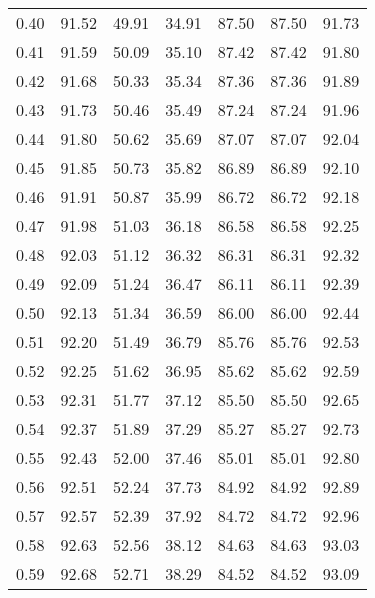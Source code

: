 \begin{tabular}{|c|c|c|c|c|c|c|}
      0.40 &     91.52 &     49.91 &      34.91 &   87.50 &      87.50 &         91.73 \\
      0.41 &     91.59 &     50.09 &      35.10 &   87.42 &      87.42 &         91.80 \\
      0.42 &     91.68 &     50.33 &      35.34 &   87.36 &      87.36 &         91.89 \\
      0.43 &     91.73 &     50.46 &      35.49 &   87.24 &      87.24 &         91.96 \\
      0.44 &     91.80 &     50.62 &      35.69 &   87.07 &      87.07 &         92.04 \\
      0.45 &     91.85 &     50.73 &      35.82 &   86.89 &      86.89 &         92.10 \\
      0.46 &     91.91 &     50.87 &      35.99 &   86.72 &      86.72 &         92.18 \\
      0.47 &     91.98 &     51.03 &      36.18 &   86.58 &      86.58 &         92.25 \\
      0.48 &     92.03 &     51.12 &      36.32 &   86.31 &      86.31 &         92.32 \\
      0.49 &     92.09 &     51.24 &      36.47 &   86.11 &      86.11 &         92.39 \\
      0.50 &     92.13 &     51.34 &      36.59 &   86.00 &      86.00 &         92.44 \\
      0.51 &     92.20 &     51.49 &      36.79 &   85.76 &      85.76 &         92.53 \\
      0.52 &     92.25 &     51.62 &      36.95 &   85.62 &      85.62 &         92.59 \\
      0.53 &     92.31 &     51.77 &      37.12 &   85.50 &      85.50 &         92.65 \\
      0.54 &     92.37 &     51.89 &      37.29 &   85.27 &      85.27 &         92.73 \\
      0.55 &     92.43 &     52.00 &      37.46 &   85.01 &      85.01 &         92.80 \\
      0.56 &     92.51 &     52.24 &      37.73 &   84.92 &      84.92 &         92.89 \\
      0.57 &     92.57 &     52.39 &      37.92 &   84.72 &      84.72 &         92.96 \\
      0.58 &     92.63 &     52.56 &      38.12 &   84.63 &      84.63 &         93.03 \\
      0.59 &     92.68 &     52.71 &      38.29 &   84.52 &      84.52 &         93.09 \\

\end{tabular}
